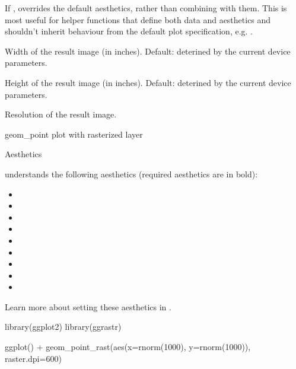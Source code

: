 \documentclass[a4paper]{book}
\begin{document}
\begin{Arguments}
\begin{ldescription}
\item[\code{inherit.aes}] If , overrides the default aesthetics,
rather than combining with them. This is most useful for helper functions
that define both data and aesthetics and shouldn't inherit behaviour from
the default plot specification, e.g. .

\item[\code{raster.width}] Width of the result image (in inches). Default: deterined by the current device parameters.

\item[\code{raster.height}] Height of the result image (in inches). Default: deterined by the current device parameters.

\item[\code{raster.dpi}] Resolution of the result image.
\end{ldescription}
\end{Arguments}
%
\begin{Value}
geom\_point plot with rasterized layer
\end{Value}
%
\begin{Section}{Aesthetics}


 understands the following aesthetics (required aesthetics are in bold):
\begin{itemize}

\item{} 
\item{} 
\item{} 
\item{} 
\item{} 
\item{} 
\item{} 
\item{} 
\item{} 

\end{itemize}

Learn more about setting these aesthetics in .

\end{Section}
%
\begin{Examples}
\begin{ExampleCode}
library(ggplot2)
library(ggrastr)

ggplot() + geom_point_rast(aes(x=rnorm(1000), y=rnorm(1000)), raster.dpi=600)

\end{ExampleCode}
\end{Examples}
\end{document}
